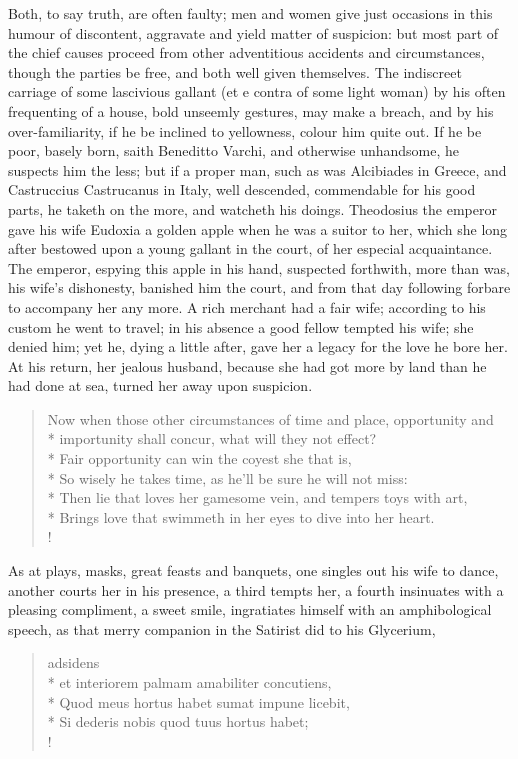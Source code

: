 Both, to say truth, are often faulty; men and women give just occasions
in this humour of discontent, aggravate and yield matter of suspicion:
but most part of the chief causes proceed from other adventitious
accidents and circumstances, though the parties be free, and both well
given themselves. The indiscreet carriage of some lascivious gallant
(et e contra of some light woman) by his often frequenting of a house,
bold unseemly gestures, may make a breach, and by his over-familiarity,
if he be inclined to yellowness, colour him quite out. If he be poor,
basely born, saith Beneditto Varchi, and otherwise unhandsome, he
suspects him the less; but if a proper man, such as was Alcibiades in
Greece, and Castruccius Castrucanus in Italy, well descended,
commendable for his good parts, he taketh on the more, and watcheth his
doings. Theodosius the emperor gave his wife Eudoxia a golden
apple when he was a suitor to her, which she long after bestowed upon a
young gallant in the court, of her especial acquaintance. The emperor,
espying this apple in his hand, suspected forthwith, more than was, his
wife's dishonesty, banished him the court, and from that day following
forbare to accompany her any more. A rich merchant had a fair
wife; according to his custom he went to travel; in his absence a good
fellow tempted his wife; she denied him; yet he, dying a little after,
gave her a legacy for the love he bore her. At his return, her jealous
husband, because she had got more by land than he had done at sea,
turned her away upon suspicion.

\begin{verse}%
Now when those other circumstances of time and place, opportunity and\\*
importunity shall concur, what will they not effect?\\*
Fair opportunity can win the coyest she that is,\\*
So wisely he takes time, as he'll be sure he will not miss:\\*
Then lie that loves her gamesome vein, and tempers toys with art,\\*
Brings love that swimmeth in her eyes to dive into her heart.\\!
\end{verse}%

As at plays, masks, great feasts and banquets, one singles out his wife
to dance, another courts her in his presence, a third tempts her, a
fourth insinuates with a pleasing compliment, a sweet smile,
ingratiates himself with an amphibological speech, as that merry
companion in the Satirist did to his Glycerium,
%
\begin{latin}
\begin{verse}%
adsidens\\*
et interiorem palmam amabiliter concutiens,\\*
Quod meus hortus habet sumat impune licebit,\\*
Si dederis nobis quod tuus hortus habet;\\!
\end{verse}%
\end{latin}

